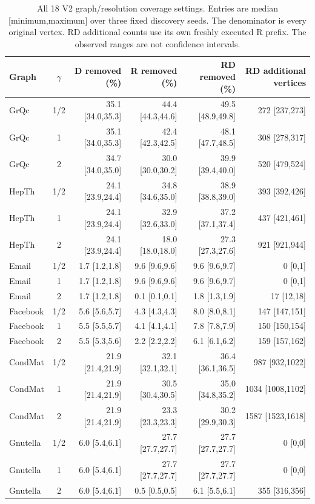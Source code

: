 \documentclass[sigconf,anonymous,review]{acmart}
\newcommand{\1}{\mathbf{1}}
\begin{document}
\begin{table}[t]
\caption{All 18 V2 graph/resolution coverage settings. Entries are median [minimum,maximum] over three fixed discovery seeds. The denominator is every original vertex. RD additional counts use its own freshly executed R prefix. The observed ranges are not confidence intervals.}\label{tab:v2-coverage}
\centering\small
\begin{tabular}{lcrrrr}\toprule
Graph & $\gamma$ & D removed (\%) & R removed (\%) & RD removed (\%) & RD additional vertices\\\midrule
GrQc & 1/2 & 35.1 [34.0,35.3] & 44.4 [44.3,44.6] & 49.5 [48.9,49.8] & 272 [237,273]\\
GrQc & 1 & 35.1 [34.0,35.3] & 42.4 [42.3,42.5] & 48.1 [47.7,48.5] & 308 [278,317]\\
GrQc & 2 & 34.7 [34.0,35.0] & 30.0 [30.0,30.2] & 39.9 [39.4,40.0] & 520 [479,524]\\
HepTh & 1/2 & 24.1 [23.9,24.4] & 34.8 [34.6,35.0] & 38.9 [38.8,39.0] & 393 [392,426]\\
HepTh & 1 & 24.1 [23.9,24.4] & 32.9 [32.6,33.0] & 37.2 [37.1,37.4] & 437 [421,461]\\
HepTh & 2 & 24.1 [23.9,24.4] & 18.0 [18.0,18.0] & 27.3 [27.3,27.6] & 921 [921,944]\\
Email & 1/2 & 1.7 [1.2,1.8] & 9.6 [9.6,9.6] & 9.6 [9.6,9.7] & 0 [0,1]\\
Email & 1 & 1.7 [1.2,1.8] & 9.6 [9.6,9.6] & 9.6 [9.6,9.7] & 0 [0,1]\\
Email & 2 & 1.7 [1.2,1.8] & 0.1 [0.1,0.1] & 1.8 [1.3,1.9] & 17 [12,18]\\
Facebook & 1/2 & 5.6 [5.6,5.7] & 4.3 [4.3,4.3] & 8.0 [8.0,8.1] & 147 [147,151]\\
Facebook & 1 & 5.5 [5.5,5.7] & 4.1 [4.1,4.1] & 7.8 [7.8,7.9] & 150 [150,154]\\
Facebook & 2 & 5.5 [5.3,5.6] & 2.2 [2.2,2.2] & 6.1 [6.1,6.2] & 159 [157,162]\\
CondMat & 1/2 & 21.9 [21.4,21.9] & 32.1 [32.1,32.1] & 36.4 [36.1,36.5] & 987 [932,1022]\\
CondMat & 1 & 21.9 [21.4,21.9] & 30.5 [30.4,30.5] & 35.0 [34.8,35.2] & 1034 [1008,1102]\\
CondMat & 2 & 21.9 [21.4,21.9] & 23.3 [23.3,23.3] & 30.2 [29.9,30.3] & 1587 [1523,1618]\\
Gnutella & 1/2 & 6.0 [5.4,6.1] & 27.7 [27.7,27.7] & 27.7 [27.7,27.7] & 0 [0,0]\\
Gnutella & 1 & 6.0 [5.4,6.1] & 27.7 [27.7,27.7] & 27.7 [27.7,27.7] & 0 [0,0]\\
Gnutella & 2 & 6.0 [5.4,6.1] & 0.5 [0.5,0.5] & 6.1 [5.5,6.1] & 355 [316,356]\\
\bottomrule\end{tabular}
\end{table}
\end{document}
